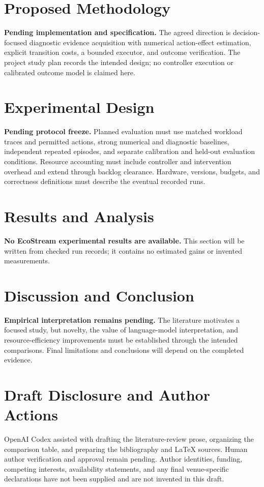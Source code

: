 \documentclass[nolineno]{ieeeaccess}
\begin{document}


\section{Proposed Methodology}
\label{sec:methodology}
\textbf{Pending implementation and specification.} The agreed direction is decision-focused diagnostic evidence acquisition with numerical action-effect estimation, explicit transition costs, a bounded executor, and outcome verification. The project study plan records the intended design; no controller execution or calibrated outcome model is claimed here.

\section{Experimental Design}
\label{sec:experimental-design}
\textbf{Pending protocol freeze.} Planned evaluation must use matched workload traces and permitted actions, strong numerical and diagnostic baselines, independent repeated episodes, and separate calibration and held-out evaluation conditions. Resource accounting must include controller and intervention overhead and extend through backlog clearance. Hardware, versions, budgets, and correctness definitions must describe the eventual recorded runs.

\section{Results and Analysis}
\label{sec:results}
\textbf{No EcoStream experimental results are available.} This section will be written from checked run records; it contains no estimated gains or invented measurements.

\section{Discussion and Conclusion}
\label{sec:discussion}
\textbf{Empirical interpretation remains pending.} The literature motivates a focused study, but novelty, the value of language-model interpretation, and resource-efficiency improvements must be established through the intended comparisons. Final limitations and conclusions will depend on the completed evidence.

\section*{Draft Disclosure and Author Actions}
OpenAI Codex assisted with drafting the literature-review prose, organizing the comparison table, and preparing the bibliography and LaTeX sources. Human author verification and approval remain pending. Author identities, funding, competing interests, availability statements, and any final venue-specific declarations have not been supplied and are not invented in this draft.



\EOD
\end{document}
